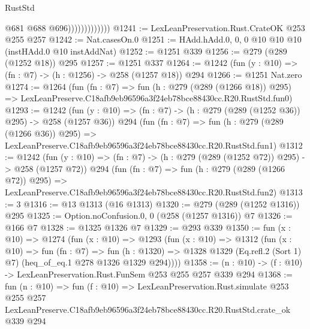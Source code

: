 \begin{lexlean}{RustStd}
\begin{coremodule}
                              @681
                              @688
                              @696)))))))))))))
@1241 := LexLeanPreservation.Rust.CrateOK @253 @255 @257
@1242 := Nat.casesOn.{0}
@1251 := HAdd.hAdd.{0, 0, 0} @10 @10 @10 (instHAdd.{0} @10 instAddNat)
@1252 := @1251 @339
@1256 := @279 (@289 (@1252 @18)) @295
@1257 := @1251 @337
@1264 := @1242 (fun (y : @10) => (fn : @7) -> (h : @1256) -> @258 (@1257 @18)) @294
@1266 := @1251 Nat.zero
@1274 := @1264
    (fun (fn : @7) =>
    fun (h : @279 (@289 (@1266 @18)) @295) =>
    LexLeanPreserve.C18afb9eb96596a3f24eb78bce88430cc.R20.RustStd.fun0)
@1293 := @1242
    (fun (y : @10) => (fn : @7) -> (h : @279 (@289 (@1252 @36)) @295) -> @258 (@1257 @36))
    @294
    (fun (fn : @7) =>
    fun (h : @279 (@289 (@1266 @36)) @295) =>
    LexLeanPreserve.C18afb9eb96596a3f24eb78bce88430cc.R20.RustStd.fun1)
@1312 := @1242
    (fun (y : @10) => (fn : @7) -> (h : @279 (@289 (@1252 @72)) @295) -> @258 (@1257 @72))
    @294
    (fun (fn : @7) =>
    fun (h : @279 (@289 (@1266 @72)) @295) =>
    LexLeanPreserve.C18afb9eb96596a3f24eb78bce88430cc.R20.RustStd.fun2)
@1313 := 3
@1316 := @13 @1313 (@16 @1313)
@1320 := @279 (@289 (@1252 @1316)) @295
@1325 := Option.noConfusion.{0, 0} (@258 (@1257 @1316)) @7
@1326 := @166 @7
@1328 := @1325 @1326 @7
@1329 := @293 @339
@1350 := fun (x : @10) =>
  @1274
    (fun (x : @10) =>
    @1293
      (fun (x : @10) =>
      @1312
        (fun (x : @10) =>
        fun (fn : @7) =>
        fun (h : @1320) =>
        @1328 @1329 (Eq.refl.{2} (Sort 1) @7) (heq_of_eq.{1} @278 @1326 @1329 @294))))
@1358 := (n : @10) -> (f : @10) -> LexLeanPreservation.Rust.FunSem @253 @255 @257 @339 @294
@1368 := fun (n : @10) =>
  fun (f : @10) =>
  LexLeanPreservation.Rust.simulate
    @253
    @255
    @257
    LexLeanPreserve.C18afb9eb96596a3f24eb78bce88430cc.R20.RustStd.crate_ok
    @339
    @294
\end{coremodule}
\end{lexlean}
